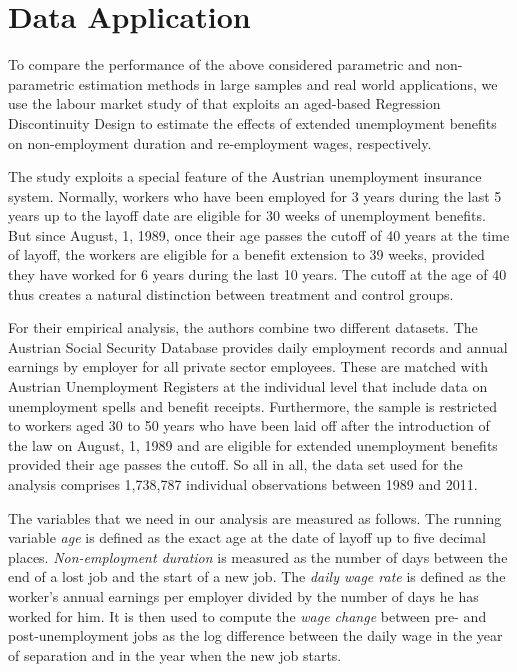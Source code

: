 
\section{Data Application} %
\label{sec: data_application}

To compare the performance of the above considered parametric and non-parametric estimation methods in large samples and real world applications, we use the labour market study of \cite{nekoei_weber} that exploits an aged-based Regression Discontinuity Design to estimate the effects of extended unemployment benefits on non-employment duration and re-employment wages, respectively.

The study exploits a special feature of the Austrian unemployment insurance system. Normally, workers who have been employed for 3 years during the last 5 years up to the layoff date are eligible for 30 weeks of unemployment benefits. But since August, 1, 1989, once their age passes the cutoff of 40 years at the time of layoff, the workers are eligible for a benefit extension to 39 weeks, provided they have worked for 6 years during the last 10 years. The cutoff at the age of 40 thus creates a natural distinction between treatment and control groups.

For their empirical analysis, the authors combine two different datasets. The Austrian Social Security Database provides daily employment records and annual earnings by employer for all private sector employees. These are matched with Austrian Unemployment Registers at the individual level that include data on unemployment spells and benefit receipts. Furthermore, the sample is restricted to workers aged 30 to 50 years who have been laid off after the introduction of the law on August, 1, 1989 and are eligible for extended unemployment benefits provided their age passes the cutoff. So all in all, the data set used for the analysis comprises 1,738,787 individual observations between 1989 and 2011.

The variables that we need in our analysis are measured as follows. The running variable \textit{age} is defined as the exact age at the date of layoff up to five decimal places. \textit{Non-employment duration} is measured as the number of days between the end of a lost job and the start of a new job. The \textit{daily wage rate} is defined as the worker's annual earnings per employer divided by the number of days he has worked for him. It is then used to compute the \textit{wage change} between pre- and post-unemployment jobs as the log difference between the daily wage in the year of separation and in the year when the new job starts.

